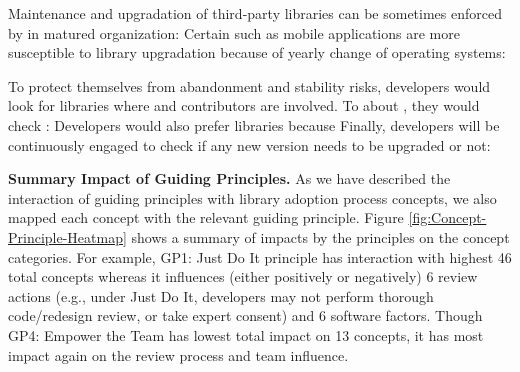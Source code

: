 Maintenance and upgradation of third-party libraries can be sometimes enforced by  in matured organization:  Certain  such as mobile applications are more susceptible to library upgradation because of yearly change of operating systems: 

To protect themselves from abandonment and stability risks, developers would look for libraries where  and contributors are involved. To  about , they would check :  Developers would also prefer libraries  because  Finally, developers will be continuously engaged to check if any new version needs to be upgraded or not: 

\textbf{Summary Impact of Guiding Principles.} As we have described the interaction of guiding principles with library adoption process concepts, we also mapped each concept with the relevant guiding principle. Figure \ref{fig:Concept-Principle-Heatmap} shows a summary of impacts by the principles on the concept categories. For example, GP1: Just Do It principle has interaction with highest 46 total concepts whereas it influences (either positively or negatively) 6 review actions (e.g., under Just Do It, developers may not perform thorough code/redesign review, or take expert consent) and 6 software factors. Though GP4: Empower the Team has lowest total impact on 13 concepts, it has most impact again on the review process and team influence.

